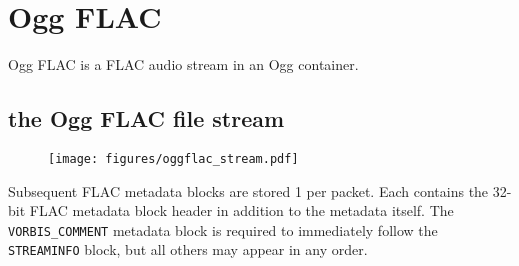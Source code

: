 \chapter{Ogg FLAC}
Ogg FLAC is a FLAC audio stream in an Ogg container.

\section{the Ogg FLAC file stream}
\begin{figure}[h]
\texttt{[image: figures/oggflac\_stream.pdf]}
\end{figure}
\par
\noindent
Subsequent FLAC metadata blocks are stored 1 per packet.
Each contains the 32-bit FLAC metadata block header
in addition to the metadata itself.
The \texttt{VORBIS\_COMMENT} metadata block is required to immediately
follow the \texttt{STREAMINFO} block, but all others may appear in
any order.
